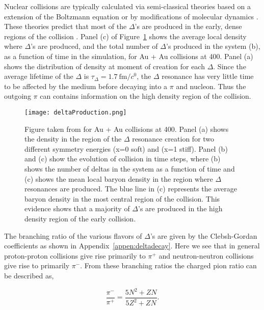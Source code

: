 Nuclear collisions are typically calculated via semi-classical theories based on a extension of the Boltzmann equation or by modifications of molecular dynamics \cite{bertsch}. These theories predict that most of the $\Delta$'s are produced in the early, dense regions of the collision \cite{mingzhang}. Panel (c) of Figure~\ref{fig:deltaProduction} shows the average local density where $\Delta$'s are produced, and the total  number of $\Delta$'s produced in the system (b), as a function of time in the simulation, for Au + Au collisions at \SI{400}{\MeVA}. Panel (a) shows the distribution of density at moment of creation for each $\Delta$. Since the average lifetime of the $\Delta$  is $\tau_{\Delta} = \SI{1.7}{\femto\metre\per\clight}$, the $\Delta$ resonance has very little time to be affected by the medium before decaying into a $\pi$ and nucleon. Thus the outgoing $\pi$ can contains information on the high density region of the collision. 

\begin{figure}[!htb]
\centering
\texttt{[image: deltaProduction.png]}
\caption{Figure taken from \cite{mingzhang} for Au + Au collisions at \SI{400}{\MeVA}. Panel (a) shows the density in the region of the $\Delta$ resonance creation for two different symmetry energies (x=0 soft) and (x=1 stiff). Panel (b) and (c) show the evolution of collision in time steps, where (b) shows the number of deltas in the system as a function of time and (c) shows the mean local baryon density in the region where $\Delta$ resonances are produced. The blue line in (c) represents the average baryon density in the most central region of the collision. This evidence shows that a majority of $\Delta$'s are produced in the high density region of the early collision.}
\label{fig:deltaProduction}
\end{figure}

The branching ratio of the various flavors of $\Delta$'s are given by the Clebsh-Gordan coefficients as shown in Appendix~\ref{appen:deltadecay}. Here we see that in general proton-proton collisions give rise primarily to  $\pi^+$ and neutron-neutron collisions give rise to primarily $\pi^-$. From these branching ratios the charged pion ratio can be described as,

\begin{equation}
\frac{\pi^-}{\pi^+} = \frac{ 5N^2 + ZN }{5Z^2 + ZN}.
\label{eq:deltaModel}
\end{equation}

